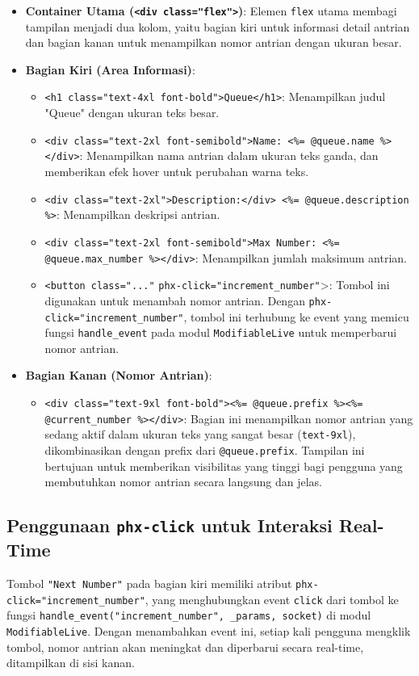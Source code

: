 \begin{itemize}
	\item \textbf{Container Utama (\texttt{<div class="flex">})}: Elemen \texttt{flex} utama membagi tampilan menjadi dua kolom, yaitu bagian kiri untuk informasi detail antrian dan bagian kanan untuk menampilkan nomor antrian dengan ukuran besar.
	
	\item \textbf{Bagian Kiri (Area Informasi)}: 
	\begin{itemize}
		\item \texttt{<h1 class="text-4xl font-bold">Queue</h1>}: Menampilkan judul "Queue" dengan ukuran teks besar.
		\item \texttt{<div class="text-2xl font-semibold">Name: <\%= @queue.name \%></div>}: Menampilkan nama antrian dalam ukuran teks ganda, dan memberikan efek hover untuk perubahan warna teks.
		\item \texttt{<div class="text-2xl">Description:</div> \texttt{<\%= @queue.description \%>}}: Menampilkan deskripsi antrian.
		\item \texttt{<div class="text-2xl font-semibold">Max Number: <\%= @queue.max\_number \%></div>}: Menampilkan jumlah maksimum antrian.
		\item \texttt{<button class="..."} \texttt{phx-click="increment\_number"}>: Tombol ini digunakan untuk menambah nomor antrian. Dengan \texttt{phx-click="increment\_number"}, tombol ini terhubung ke event yang memicu fungsi \texttt{handle\_event} pada modul \texttt{ModifiableLive} untuk memperbarui nomor antrian.
	\end{itemize}
	
	\item \textbf{Bagian Kanan (Nomor Antrian)}:
	\begin{itemize}
		\item \texttt{<div class="text-9xl font-bold"><\%= @queue.prefix \%><\%= @current\_number \%></div>}: Bagian ini menampilkan nomor antrian yang sedang aktif dalam ukuran teks yang sangat besar (\texttt{text-9xl}), dikombinasikan dengan prefix dari \texttt{@queue.prefix}. Tampilan ini bertujuan untuk memberikan visibilitas yang tinggi bagi pengguna yang membutuhkan nomor antrian secara langsung dan jelas.
	\end{itemize}
\end{itemize}

\subsection{Penggunaan \texttt{phx-click} untuk Interaksi Real-Time}
Tombol \texttt{"Next Number"} pada bagian kiri memiliki atribut \texttt{phx-click="increment\_number"}, yang menghubungkan event \texttt{click} dari tombol ke fungsi \texttt{handle\_event("increment\_number", \_params, socket)} di modul \texttt{ModifiableLive}. Dengan menambahkan event ini, setiap kali pengguna mengklik tombol, nomor antrian akan meningkat dan diperbarui secara real-time, ditampilkan di sisi kanan.

